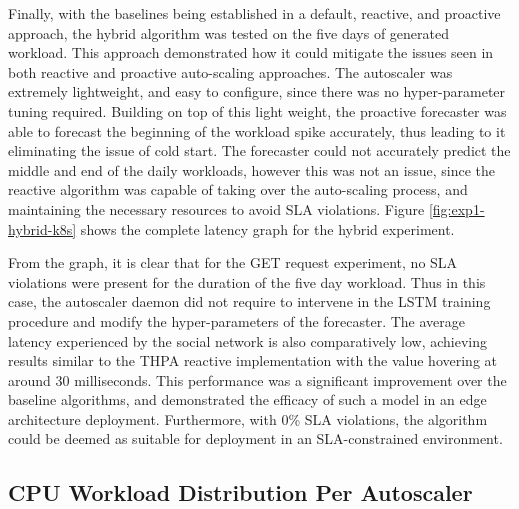 Finally, with the baselines being established in a default, reactive, and proactive approach, the hybrid algorithm was tested on the five days of generated workload. This approach demonstrated how it could mitigate the issues seen in both reactive and proactive auto-scaling approaches. The autoscaler was extremely lightweight, and easy to configure, since there was no hyper-parameter tuning required. Building on top of this light weight, the proactive forecaster was able to forecast the beginning of the workload spike accurately, thus leading to it eliminating the issue of cold start. The forecaster could not accurately predict the middle and end of the daily workloads, however this was not an issue, since the reactive algorithm was capable of taking over the auto-scaling process, and maintaining the necessary resources to avoid SLA violations. Figure \ref{fig:exp1-hybrid-k8s} shows the complete latency graph for the hybrid experiment.\par

From the graph, it is clear that for the GET request experiment, no SLA violations were present for the duration of the five day workload. Thus in this case, the autoscaler daemon did not require to intervene in the LSTM training procedure and modify the hyper-parameters of the forecaster. The average latency experienced by the social network is also comparatively low, achieving results similar to the THPA reactive implementation with the value hovering at around 30 milliseconds. This performance was a significant improvement over the baseline algorithms, and demonstrated the efficacy of such a model in an edge architecture deployment. Furthermore, with 0\% SLA violations, the algorithm could be deemed as suitable for deployment in an SLA-constrained environment.\par


\subsection {CPU Workload Distribution Per Autoscaler}
\label{subsec:ch5-exp1-workload-dist}

